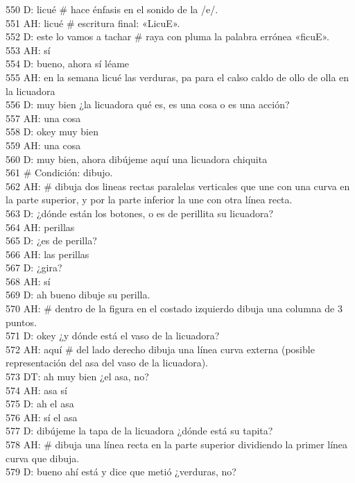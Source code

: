 550 D: licué \# hace énfasis en el sonido de la /e/.\\
551 AH: licué \# escritura final: «LicuE».\\
552 D: este lo vamos a tachar \# raya con pluma la palabra errónea «ficuE».\\
553 AH: sí\\
554 D: bueno, ahora sí léame\\
555 AH: en la semana licué las verduras, pa para el calso caldo de ollo de olla en la licuadora\\
556 D: muy bien ¿la licuadora qué es, es una cosa o es una acción?\\
557 AH: una cosa\\
558 D: okey muy bien\\
559 AH: una cosa\\
560 D: muy bien, ahora dibújeme aquí una licuadora chiquita\\
561 \# Condición: dibujo.\\
562 AH: \# dibuja dos lineas rectas paralelas verticales que une con una curva en la parte superior, y por la parte inferior la une con otra línea recta.\\
563 D: ¿dónde están los botones, o es de perillita su licuadora?\\
564 AH: perillas\\
565 D: ¿es de perilla?\\
566 AH: las perillas\\
567 D: ¿gira?\\
568 AH: sí\\
569 D: ah bueno dibuje su perilla.\\
570 AH: \# dentro de la figura en el costado izquierdo dibuja una columna de 3 puntos.\\
571 D: okey ¿y dónde está el vaso de la licuadora?\\
572 AH: aquí \# del lado derecho dibuja una línea curva externa (posible representación del asa del vaso de la licuadora).\\
573 DT: ah muy bien ¿el asa, no?\\
574 AH: asa sí\\
575 D: ah el asa\\
576 AH: sí el asa\\
577 D: dibújeme la tapa de la licuadora ¿dónde está su tapita?\\
578 AH: \# dibuja una línea recta en la parte superior dividiendo la primer línea curva que dibuja.\\
579 D: bueno ahí está y dice que metió ¿verduras, no?\\
